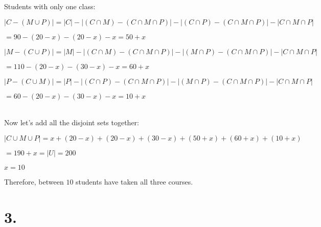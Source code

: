 \documentclass{article}
\newenvironment{Solution}
{\noindent\color{red}}
{\newline}
\begin{document}
\begin{Solution}
\begin{adjustwidth}{2em}{0em}
        Students with only one class:

        \begin{adjustwidth}{2em}{0em}
            $|C - (M \cup P)|  = |C| - |(C \cap M) - (C \cap M \cap P)| - |(C \cap P) - (C \cap M \cap P)| - |C \cap M \cap P|$

            \hspace*{6.585em}$ = 90 - (20 - x) - (20 - x) - x = 50 + x$

            $|M - (C \cup P)| = |M| - |(C \cap M) - (C \cap M \cap P)| - |(M \cap P)- (C \cap M \cap P)| - |C \cap M \cap P|$

            \hspace*{6.585em}$ = 110 - (20 - x) - (30 - x) - x = 60 + x$

            $|P - (C \cup M)| = |P| - |(C \cap P) - (C \cap M \cap P)| - |(M \cap P)- (C \cap M \cap P)| - |C \cap M \cap P|$

            \hspace*{6.585em}$ = 60 - (20 - x) - (30 - x) - x = 10 + x$
        \end{adjustwidth}
    \end{adjustwidth}

    \ \\

    Now let's add all the disjoint sets together:

    $|C \cup M \cup P| = x + (20 - x) + (20 - x) + (30 - x) + (50 + x) + (60 + x) + (10 + x)$

    \phantom{ }

    \hspace*{5.71em}$= 190 + x = |U| = 200$

    \hspace*{5.71em}$x = 10$

    \phantom{ }

    Therefore, between $10$ students have taken all three courses. 
\end{Solution}







\vspace*{5em}




\section*{3. }
\end{document}
